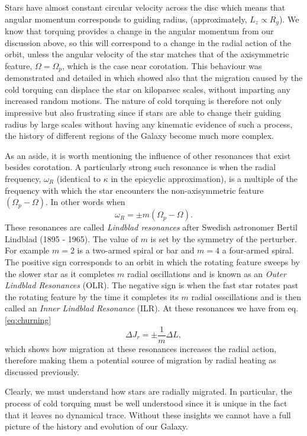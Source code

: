 Stars have almost constant circular velocity across the disc which means that angular momentum corresponds to guiding radius, (approximately, $L_z \propto R_g$). We know that torquing provides a change in the angular momentum from our discussion above, so this will correspond to a change in the radial action of the orbit, unless the angular velocity of the star matches that of the axisymmetric feature, $\Omega = \Omega_p$, which is the case near corotation. This behaviour was demonstrated and detailed in \cite{sellwood:02} which showed also that the migration caused by the cold torquing can displace the star on kiloparsec scales, without imparting any increased random motions. The nature of cold torquing is therefore not only impressive but also frustrating since if stars are able to change their guiding radius by large scales without having any kinematic evidence of such a process, the history of different regions of the Galaxy become much more complex. 

As an aside, it is worth mentioning the influence of other resonances that exist besides corotation. A particularly strong such resonance is when the radial frequency, $\omega_R$ (identical to $\kappa$ in the epicyclic approximation), is a multiple of the frequency with which the star encounters the non-axisymmetric feature $(\Omega_p - \Omega)$. In other words when
\begin{equation}
\omega_R = \pm m(\Omega_p - \Omega).
\end{equation}
These resonances are called \textit{Lindblad resonances} after Swedish astronomer Bertil Lindblad (1895 - 1965). The value of $m$ is set by the symmetry of the perturber. For example $m=2$ is a two-armed spiral or bar and $m=4$ a four-armed spiral. The positive sign corresponds to an orbit in which the rotating feature sweeps by the slower star as it completes $m$ radial oscillations and is known as an \textit{Outer Lindblad Resonances} (OLR). The negative sign is when the fast star rotates past the rotating feature by the time it completes its $m$ radial osscillations and is then called an \textit{Inner Lindblad Resonance} (ILR). At these resonances we have from eq. \eqref{eq:churning}
\begin{equation}
    \Delta J_r = \pm \frac{1}{m}\Delta L,
\end{equation}
which shows how migration at these resonances increases the radial action, therefore making them a potential source of migration by radial heating as discussed previously.

Clearly, we must understand how stars are radially migrated. In particular, the process of cold torquing must be well understood since it is unique in the fact that it leaves no dynamical trace. Without these insights we cannot have a full picture of the history and evolution of our Galaxy.